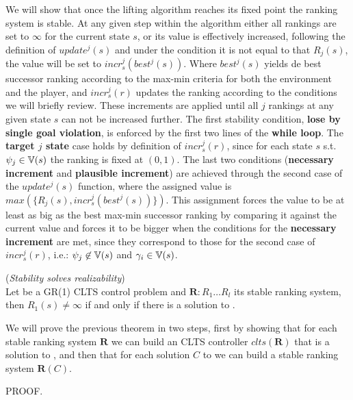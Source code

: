 We will show that once the lifting algorithm reaches its fixed point the ranking system is stable.
At any given step within the algorithm either all rankings are set to $\infty$ for the current state $s$, or its value is effectively increased, following the definition of $update^j(s)$ and under the condition it is not equal to that $R_j(s)$, the value will be set to $incr_s^j(best^j(s))$.  Where $best^j(s)$ yields de best successor ranking according to the max-min criteria for both the environment and the player, and $incr_s^j(r)$ updates the ranking according to the conditions we will briefly review. These increments are applied until all $j$ rankings at any given state $s$ can not be increased further. The first stability condition, \textbf{lose by single goal violation}, is enforced by the first two lines of the \textbf{while loop}. The \textbf{target $j$ state} case holds by definition of $incr_s^j(r)$, since for each state $s$ s.t. $\psi_j \in \mathbb{V}(s)$ the ranking is fixed at $(0,1)$. The last two conditions (\textbf{necessary increment} and \textbf{plausible increment}) are achieved through the second case of the $update^j(s)$ function, where the assigned value is $max(\{R_j(s),incr_s^j(best^j(s))\})$. This assignment forces the value to be at least as big as the best max-min successor ranking by comparing it against the current value and forces it to be bigger when the conditions for the \textbf{necessary increment} are met, since they correspond to those for the second case of $incr_s^j(r)$, i.e.: $\psi_j \not\in \mathbb{V}(s)$ and $\gamma_i \in \mathbb{V}(s)$. 

\begin{theorem}(\emph{Stability solves realizability})\label{theorem:gr1_stability_realizability}\\
	Let \controlProblemDef be a GR(1) CLTS control problem and $\mathbf{R}:R_1 \ldots R_l$ its stable ranking system, then $R_1(s) \neq \infty$ if and only if there is a solution to \controlProblem.
	\normalsize
\end{theorem}

We will prove the previous theorem in two steps, first by showing that for each stable ranking system $\mathbf{R}$ we can build an CLTS controller $clts(\mathbf{R})$ that is a solution to \controlProblem, and then that for each solution $C$ to \controlProblem we can build a stable ranking system $\mathbf{R}(C)$.

PROOF.